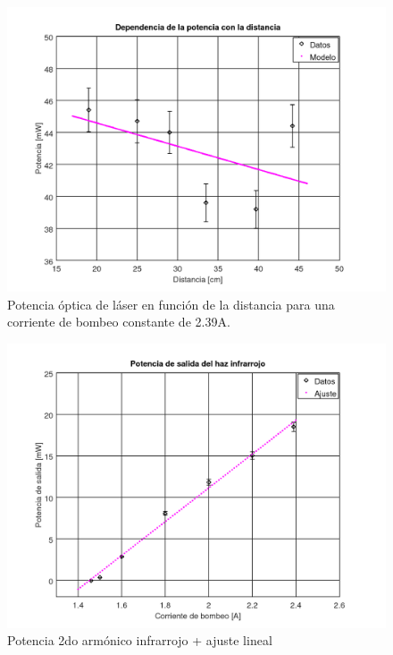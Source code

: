 \documentclass[10pt, a4paper]{article}%
\begin{document}
\begin{multicols}{2}
\begin{figure}[H]
    \centering
    \includegraphics[scale=0.4]{Graficos/potvsdist.png}
    \caption{Potencia óptica de láser en función de la distancia para una corriente de bombeo constante de 2.39A.}
    \label{laservsdist}
\end{figure}

\begin{figure}[H]
    \centering
    \includegraphics[scale=0.4]{Graficos/pot_infrarrojo.png}
    \caption{Potencia 2do armónico infrarrojo + ajuste lineal}
    \label{potrojo}
\end{figure}


\end{multicols}
\end{document}
